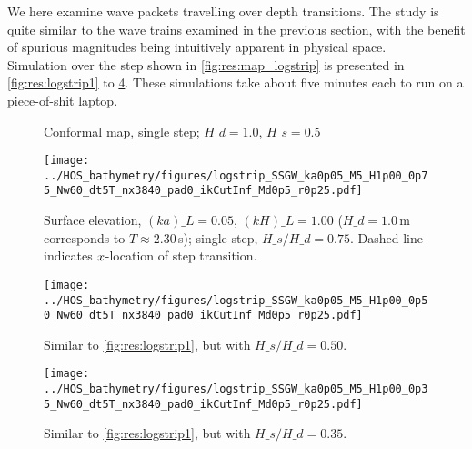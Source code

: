 %
%
%
%

We here examine wave packets travelling over depth transitions.
The study is quite similar to the wave trains examined in the previous section, with the benefit of spurious magnitudes being intuitively apparent in physical space.\\


Simulation over the step shown in \autoref{fig:res:map_logstrip} is presented in \autoref{fig:res:logstrip1} to \ref{fig:res:logstrip3}.
These simulations take about five minutes each to run on a piece-of-shit laptop.

\begin{figure}[H]%
\centering
{}%
\caption{Conformal map, single step; $H\_d = 1.0$, $H\_s = 0.5$}%
\label{fig:res:map_logstrip}%
\end{figure}

\begin{figure}[H]%
\centering
\texttt{[image: ../HOS\_bathymetry/figures/logstrip\_SSGW\_ka0p05\_M5\_H1p00\_0p75\_Nw60\_dt5T\_nx3840\_pad0\_ikCutInf\_Md0p5\_r0p25.pdf]}%
\caption{Surface elevation, $(ka)\_L = 0.05$, $(kH)\_L = 1.00$ ($H\_d=1.0$\,m corresponds to $T\approx2.30$\,s); single step, $H\_s/H\_d = 0.75$. Dashed line indicates $x$-location of step transition.}%
\label{fig:res:logstrip1}%
\end{figure}
\begin{figure}[H]%
\centering 
\texttt{[image: ../HOS\_bathymetry/figures/logstrip\_SSGW\_ka0p05\_M5\_H1p00\_0p50\_Nw60\_dt5T\_nx3840\_pad0\_ikCutInf\_Md0p5\_r0p25.pdf]}%
\caption{Similar to \autoref{fig:res:logstrip1}, but with $H\_s/H\_d = 0.50$.}%
\label{fig:res:logstrip2}%
\end{figure}
\begin{figure}[H]%
\centering 															  
\texttt{[image: ../HOS\_bathymetry/figures/logstrip\_SSGW\_ka0p05\_M5\_H1p00\_0p35\_Nw60\_dt5T\_nx3840\_pad0\_ikCutInf\_Md0p5\_r0p25.pdf]}%
\caption{Similar to \autoref{fig:res:logstrip1}, but with $H\_s/H\_d = 0.35$.}%
\label{fig:res:logstrip3}%
\end{figure}


